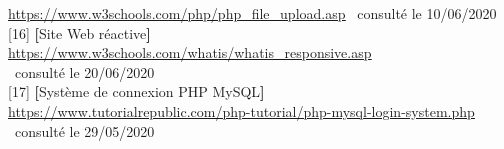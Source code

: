 \documentclass[12pt]{report}
\begin{document}
\hspace*{0.43in}
\textcolor{blue}{\uline{\url{https://www.w3schools.com/php/php_file_upload.asp}}} \, consulté le 10/06/2020
\\
{[16]} \quad \textbf{[}Site Web réactive\textbf{]}\\
\hspace*{0.43in}
\textcolor{blue}{\uline{\url{https://www.w3schools.com/whatis/whatis_responsive.asp}}}
\\
\hspace*{0.36in}
\, consulté le 20/06/2020
\\
{[17]} \quad \textbf{[}Système de connexion PHP MySQL\textbf{]}\\
\hspace*{0.43in}
\textcolor{blue}{\uline{\url{https://www.tutorialrepublic.com/php-tutorial/php-mysql-login-system.php}}}
\\
\hspace*{0.36in}
\, consulté le 29/05/2020
\end{document}
